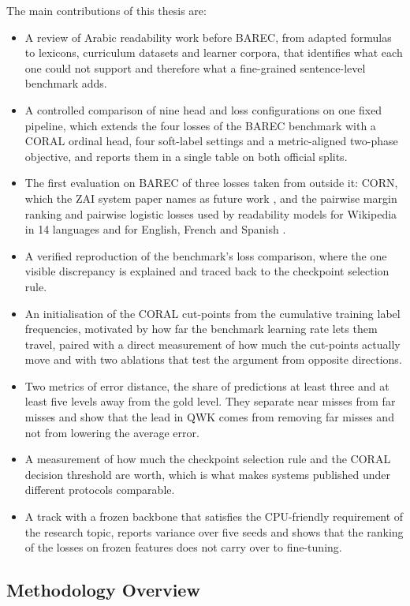 The main contributions of this thesis are:
\begin{itemize}
\item A review of Arabic readability work before BAREC, from adapted formulas to lexicons,
curriculum datasets and learner corpora, that identifies what each one could not support and
therefore what a fine-grained sentence-level benchmark adds.
\item A controlled comparison of nine head and loss configurations on one fixed pipeline, which
extends the four losses of the BAREC benchmark with a CORAL ordinal head, four soft-label
settings and a metric-aligned two-phase objective, and reports them in a single table on both
official splits.
\item The first evaluation on BAREC of three losses taken from outside it: CORN, which the ZAI
system paper names as future work \cite{nazzal2025zai}, and the pairwise margin ranking and
pairwise logistic losses used by readability models for Wikipedia in 14 languages
\cite{trokhymovych2024readability} and for English, French and Spanish \cite{lee2022neural}.
\item A verified reproduction of the benchmark's loss comparison, where the one visible
discrepancy is explained and traced back to the checkpoint selection rule.
\item An initialisation of the CORAL cut-points from the cumulative training label frequencies,
motivated by how far the benchmark learning rate lets them travel, paired with a direct
measurement of how much the cut-points actually move and with two ablations that test the
argument from opposite directions.
\item Two metrics of error distance, the share of predictions at least three and at least five
levels away from the gold level. They separate near misses from far misses and show that the
lead in QWK comes from removing far misses and not from lowering the average error.
\item A measurement of how much the checkpoint selection rule and the CORAL decision threshold
are worth, which is what makes systems published under different protocols comparable.
\item A track with a frozen backbone that satisfies the CPU-friendly requirement of the research
topic, reports variance over five seeds and shows that the ranking of the losses on frozen
features does not carry over to fine-tuning.
\end{itemize}

\subsection{Methodology Overview}

